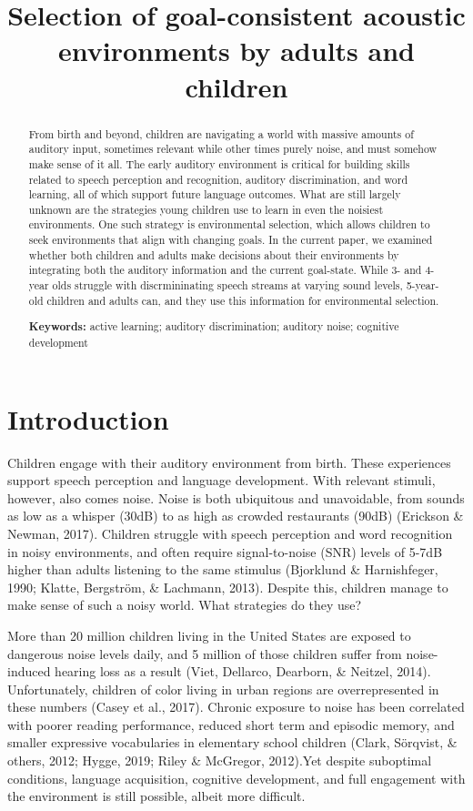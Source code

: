\documentclass[10pt, letterpaper]{article}
\title{Selection of goal-consistent acoustic environments by adults and
children}
\begin{document}
\maketitle

\begin{abstract}
From birth and beyond, children are navigating a world with massive
amounts of auditory input, sometimes relevant while other times purely
noise, and must somehow make sense of it all. The early auditory
environment is critical for building skills related to speech perception
and recognition, auditory discrimination, and word learning, all of
which support future language outcomes. What are still largely unknown
are the strategies young children use to learn in even the noisiest
environments. One such strategy is environmental selection, which allows
children to seek environments that align with changing goals. In the
current paper, we examined whether both children and adults make
decisions about their environments by integrating both the auditory
information and the current goal-state. While 3- and 4-year olds
struggle with discrmininating speech streams at varying sound levels,
5-year-old children and adults can, and they use this information for
environmental selection.

\textbf{Keywords:}
active learning; auditory discrimination; auditory noise; cognitive
development
\end{abstract}

\hypertarget{introduction}{%
\section{Introduction}\label{introduction}}

Children engage with their auditory environment from birth. These
experiences support speech perception and language development. With
relevant stimuli, however, also comes noise. Noise is both ubiquitous
and unavoidable, from sounds as low as a whisper (30dB) to as high as
crowded restaurants (90dB) (Erickson \& Newman, 2017). Children struggle
with speech perception and word recognition in noisy environments, and
often require signal-to-noise (SNR) levels of 5-7dB higher than adults
listening to the same stimulus (Bjorklund \& Harnishfeger, 1990; Klatte,
Bergström, \& Lachmann, 2013). Despite this, children manage to make
sense of such a noisy world. What strategies do they use?

More than 20 million children living in the United States are exposed to
dangerous noise levels daily, and 5 million of those children suffer
from noise-induced hearing loss as a result (Viet, Dellarco, Dearborn,
\& Neitzel, 2014). Unfortunately, children of color living in urban
regions are overrepresented in these numbers (Casey et al., 2017).
Chronic exposure to noise has been correlated with poorer reading
performance, reduced short term and episodic memory, and smaller
expressive vocabularies in elementary school children (Clark, Sörqvist,
\& others, 2012; Hygge, 2019; Riley \& McGregor, 2012).Yet despite
suboptimal conditions, language acquisition, cognitive development, and
full engagement with the environment is still possible, albeit more
difficult.
\end{document}
